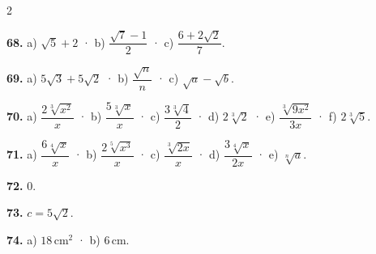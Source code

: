 \documentclass[13pt,a4paper]{extarticle}
\begin{document}
\begin{multicols}{2}
\par\noindent\begin{minipage}{\linewidth}
\textbf{68.} a) $\sqrt5+2$ · b) $\dfrac{\sqrt7-1}{2}$ · c) $\dfrac{6+2\sqrt2}{7}$.\par
\end{minipage}\par\vspace{1.6mm}
\par\noindent\begin{minipage}{\linewidth}
\textbf{69.} a) $5\sqrt3+5\sqrt2$ · b) $\dfrac{\sqrt n}{n}$ · c) $\sqrt a-\sqrt b$.\par
\end{minipage}\par\vspace{1.6mm}
\par\noindent\begin{minipage}{\linewidth}
\textbf{70.} a) $\dfrac{2\sqrt[3]{x^2}}{x}$ · b) $\dfrac{5\sqrt[3]{x}}{x}$ · c) $\dfrac{3\sqrt[3]{4}}{2}$ · d) $2\sqrt[3]{2}$ · e) $\dfrac{\sqrt[3]{9x^2}}{3x}$ · f) $2\sqrt[3]{5}$.\par
\end{minipage}\par\vspace{1.6mm}
\par\noindent\begin{minipage}{\linewidth}
\textbf{71.} a) $\dfrac{6\sqrt[4]{x}}{x}$ · b) $\dfrac{2\sqrt[5]{x^3}}{x}$ · c) $\dfrac{\sqrt[3]{2x}}{x}$ · d) $\dfrac{3\sqrt[4]{x}}{2x}$ · e) $\sqrt[n]{a}$.\par
\end{minipage}\par\vspace{1.6mm}
\par\noindent\begin{minipage}{\linewidth}
\textbf{72.} $0$.\par
\end{minipage}\par\vspace{1.6mm}
\par\noindent\begin{minipage}{\linewidth}
\textbf{73.} $c=5\sqrt2$.\par
\end{minipage}\par\vspace{1.6mm}
\par\noindent\begin{minipage}{\linewidth}
\textbf{74.} a) $18\,\text{cm}^2$ · b) $6\,\text{cm}$.\par

\end{minipage}
\end{multicols}
\end{document}
